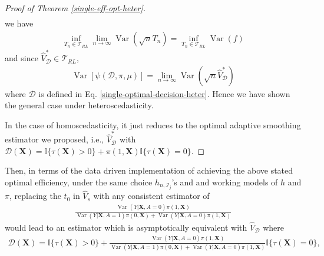 \documentclass[11pt]{article}
\theoremstyle{referenceplain}
\theoremstyle{referencedefinition}
\theoremstyle{referenceremark}
\begin{document}
\begin{proof}[Proof of Theorem \ref{single-eff-opt-heter}]
\begin{align}
    \end{align}
we have
\begin{align*}
    \inf_{T_n\in\mathcal{T}_{RL}}\lim_{n\to\infty}\operatorname{Var}(\sqrt{n}T_n)= \inf_{T_n\in\mathcal{T}_{RL}}\operatorname{Var}(f) 
\end{align*}
and since $\widehat{V}_{\mathcal{D}}^{*}\in\mathcal{T}_{RL}$,
\begin{align*}
    \operatorname{Var}\left[\psi(\mathcal{D},\pi,\mu)\right] = \lim_{n\to\infty}\operatorname{Var}(\sqrt{n}\widehat{V}_{\mathcal{D}}^{*})
\end{align*}
where $\mathcal{D}$ is defined in Eq. \eqref{single-optimal-decision-heter}. Hence we have shown the general case under heteroscedasticity.


In the case of homoscedasticity, it just reduces to the optimal adaptive smoothing estimator we proposed, i.e., $\widehat{V}_{\mathcal{D}}^*$ with $\mathcal{D}(\mathbf{X})=\mathbb{I}\{\tau(\mathbf{X})>0\}+\pi(1,\mathbf{X})\mathbb{I}\{\tau(\mathbf{X})=0\}$. 
\end{proof}
Then, in terms of the data driven implementation of achieving the above stated optimal efficiency, under the same choice $h_{n, \mathcal{I}_j}$'s and and working models of $h$ and $\pi$, replacing the $t_0$ in $\widehat{V}_s$ with any consistent estimator of 
\begin{align}\label{single-heter-t0}
    \frac{\operatorname{Var}(Y|\mathbf{X},A=0)\pi(1,\mathbf{X})}{\operatorname{Var}(Y|\mathbf{X},A=1)\pi(0,\mathbf{X})+\operatorname{Var}(Y|\mathbf{X},A=0)\pi(1,\mathbf{X})}
\end{align}
would lead to an estimator which is asymptotically equivalent with $\widehat{V}_{\mathcal{D}}$ where
\begin{align*}
    \mathcal{D}(\mathbf{X})=\mathbb{I}\{\tau(\mathbf{X})>0\}+\frac{\operatorname{Var}(Y|\mathbf{X},A=0)\pi(1,\mathbf{X})}{\operatorname{Var}(Y|\mathbf{X},A=1)\pi(0,\mathbf{X})+\operatorname{Var}(Y|\mathbf{X},A=0)\pi(1,\mathbf{X})}\mathbb{I}\{\tau(\mathbf{X})=0\},
\end{align*}
\end{document}
